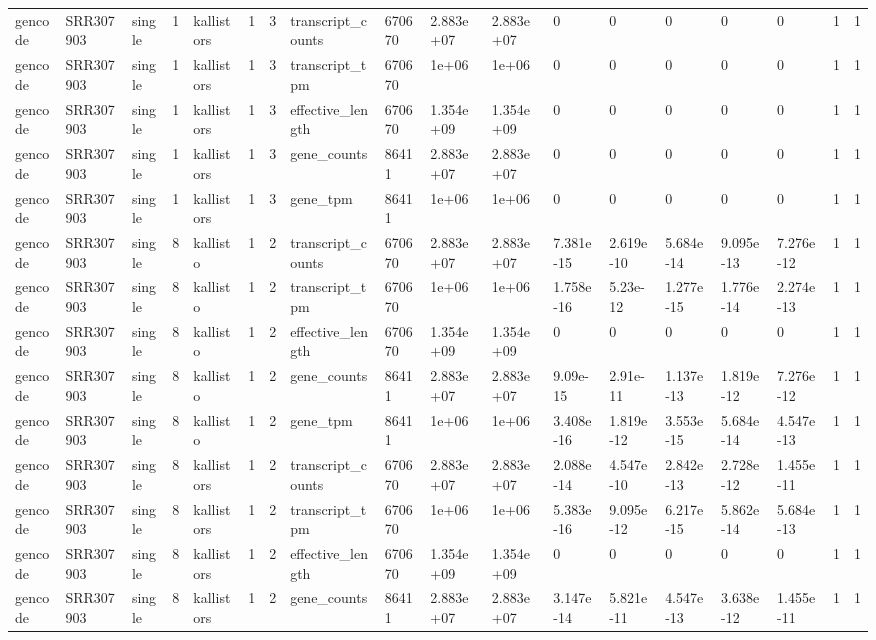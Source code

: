 \begin{tabular}{llllllllllllllllll}
gencode & SRR307903 & single & 1 & kallistors & 1 & 3 & transcript\_counts & 670670 & 2.883e+07 & 2.883e+07 & 0 & 0 & 0 & 0 & 0 & 1 & 1 \\
gencode & SRR307903 & single & 1 & kallistors & 1 & 3 & transcript\_tpm & 670670 & 1e+06 & 1e+06 & 0 & 0 & 0 & 0 & 0 & 1 & 1 \\
gencode & SRR307903 & single & 1 & kallistors & 1 & 3 & effective\_length & 670670 & 1.354e+09 & 1.354e+09 & 0 & 0 & 0 & 0 & 0 & 1 & 1 \\
gencode & SRR307903 & single & 1 & kallistors & 1 & 3 & gene\_counts & 86411 & 2.883e+07 & 2.883e+07 & 0 & 0 & 0 & 0 & 0 & 1 & 1 \\
gencode & SRR307903 & single & 1 & kallistors & 1 & 3 & gene\_tpm & 86411 & 1e+06 & 1e+06 & 0 & 0 & 0 & 0 & 0 & 1 & 1 \\
gencode & SRR307903 & single & 8 & kallisto & 1 & 2 & transcript\_counts & 670670 & 2.883e+07 & 2.883e+07 & 7.381e-15 & 2.619e-10 & 5.684e-14 & 9.095e-13 & 7.276e-12 & 1 & 1 \\
gencode & SRR307903 & single & 8 & kallisto & 1 & 2 & transcript\_tpm & 670670 & 1e+06 & 1e+06 & 1.758e-16 & 5.23e-12 & 1.277e-15 & 1.776e-14 & 2.274e-13 & 1 & 1 \\
gencode & SRR307903 & single & 8 & kallisto & 1 & 2 & effective\_length & 670670 & 1.354e+09 & 1.354e+09 & 0 & 0 & 0 & 0 & 0 & 1 & 1 \\
gencode & SRR307903 & single & 8 & kallisto & 1 & 2 & gene\_counts & 86411 & 2.883e+07 & 2.883e+07 & 9.09e-15 & 2.91e-11 & 1.137e-13 & 1.819e-12 & 7.276e-12 & 1 & 1 \\
gencode & SRR307903 & single & 8 & kallisto & 1 & 2 & gene\_tpm & 86411 & 1e+06 & 1e+06 & 3.408e-16 & 1.819e-12 & 3.553e-15 & 5.684e-14 & 4.547e-13 & 1 & 1 \\
gencode & SRR307903 & single & 8 & kallistors & 1 & 2 & transcript\_counts & 670670 & 2.883e+07 & 2.883e+07 & 2.088e-14 & 4.547e-10 & 2.842e-13 & 2.728e-12 & 1.455e-11 & 1 & 1 \\
gencode & SRR307903 & single & 8 & kallistors & 1 & 2 & transcript\_tpm & 670670 & 1e+06 & 1e+06 & 5.383e-16 & 9.095e-12 & 6.217e-15 & 5.862e-14 & 5.684e-13 & 1 & 1 \\
gencode & SRR307903 & single & 8 & kallistors & 1 & 2 & effective\_length & 670670 & 1.354e+09 & 1.354e+09 & 0 & 0 & 0 & 0 & 0 & 1 & 1 \\
gencode & SRR307903 & single & 8 & kallistors & 1 & 2 & gene\_counts & 86411 & 2.883e+07 & 2.883e+07 & 3.147e-14 & 5.821e-11 & 4.547e-13 & 3.638e-12 & 1.455e-11 & 1 & 1 \\

\end{tabular}
